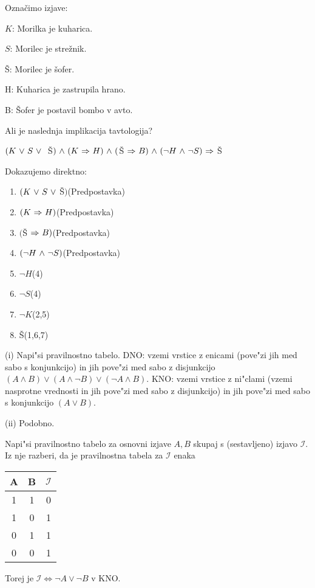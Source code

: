\begin{answer}{1.11}
Označimo izjave:

$K$: Morilka je kuharica.

$S$: Morilec je strežnik.

Š: Morilec je šofer.

H: Kuharica je zastrupila hrano.

B: Šofer je postavil bombo v avto.

\medskip
Ali je naslednja implikacija tavtologija?

$(K{~\vee~} S{~\vee~}$ \v S$){~\wedge~}(K{~\Rightarrow~} H){~\wedge~}($Š${~\Rightarrow~} B){~\wedge~}(\neg H{~\wedge~} \neg S){~\Rightarrow~} $Š

Dokazujemo direktno:
\bigskip
\begin{enumerate}
    \item $(K{~\vee~} S{~\vee~} $Š$)$\hfill (Predpostavka)
    \item $(K{~\Rightarrow~} H)$\hfill (Predpostavka)
    \item $($Š${~\Rightarrow~} B)$\hfill (Predpostavka)
    \item $(\neg H{~\wedge~} \neg S)$\hfill (Predpostavka)
    \item $\neg H$\hfill (4)
    \item $\neg S$\hfill (4)
    \item $\neg K$\hfill (2,5)
    \item Š\hfill (1,6,7)
\end{enumerate}

\end{answer}
\begin{answer}{1.12}

(i) Napi"si pravilnostno tabelo. DNO: vzemi vrstice z enicami (pove"zi jih med sabo s konjunkcijo) in jih pove"zi med sabo z disjunkcijo
$(A\wedge B) \vee (A\wedge \neg B) \vee (\neg A \wedge B)$. KNO: vzemi vrstice z ni"clami (vzemi nasprotne vrednosti in jih pove"zi med sabo z disjunkcijo) in jih pove"zi med sabo s konjunkcijo $(A \vee B)$.

(ii) Podobno.
\end{answer}
\begin{answer}{1.14}
Napi"si pravilnostno tabelo za osnovni izjave $A, B$ skupaj s (sestavljeno) izjavo $\mathcal{I}$. Iz nje razberi, da je pravilnostna tabela za $\mathcal{I}$ enaka
\begin{table}[ht!]
\centering
\begin{tabular}{c|c|c}
A & B & $\mathcal{I}$\\
\hline
1 & 1 & 0\\
1 & 0 & 1\\
0 & 1 & 1\\
0 & 0 & 1
\end{tabular}
\end{table}

Torej je $\mathcal{I} \Leftrightarrow \neg A \vee \neg B$ v KNO.
\end{answer}
